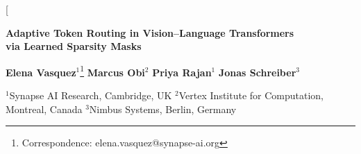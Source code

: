 
\twocolumn[{%
  \begin{center}

    \vspace{10pt}

    {\LARGE\bfseries\color{NexaDark}
      Adaptive Token Routing in Vision--Language Transformers\\[4pt]
      via Learned Sparsity Masks
    \par}

    \vspace{8pt}

    {\normalsize
      \textbf{Elena Vasquez}$^{1}$\thanks{Correspondence: elena.vasquez@synapse-ai.org}\quad
      \textbf{Marcus Obi}$^{2}$\quad
      \textbf{Priya Rajan}$^{1}$\quad
      \textbf{Jonas Schreiber}$^{3}$
    \par}

    \vspace{4pt}

    {\small\color{NexaGray}
      $^{1}$Synapse AI Research, Cambridge, UK\quad
      $^{2}$Vertex Institute for Computation, Montreal, Canada\quad
      $^{3}$Nimbus Systems, Berlin, Germany
    \par}

    \vspace{12pt}


\end{center}}
